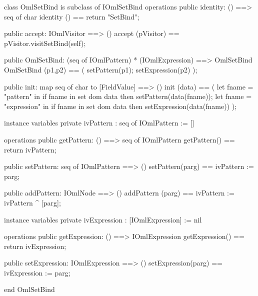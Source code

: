 \begin{vdm_al}
class OmlSetBind is subclass of IOmlSetBind
operations
  public identity: () ==> seq of char
  identity () == return "SetBind";

  public accept: IOmlVisitor ==> ()
  accept (pVisitor) == pVisitor.visitSetBind(self);

  public OmlSetBind:
      (seq of IOmlPattern) *
      (IOmlExpression) ==> OmlSetBind
  OmlSetBind (p1,p2) == 
   ( setPattern(p1);
     setExpression(p2) );

  public init: map seq of char to [FieldValue] ==> ()
  init (data) ==
    ( let fname = "pattern" in
        if fname in set dom data
        then setPattern(data(fname));
      let fname = "expression" in
        if fname in set dom data
        then setExpression(data(fname)) );

instance variables
  private ivPattern : seq of IOmlPattern := []

operations
  public getPattern: () ==> seq of IOmlPattern
  getPattern() == return ivPattern;

  public setPattern: seq of IOmlPattern ==> ()
  setPattern(parg) == ivPattern := parg;

  public addPattern: IOmlNode ==> ()
  addPattern (parg) == ivPattern := ivPattern ^ [parg];

instance variables
  private ivExpression : [IOmlExpression] := nil

operations
  public getExpression: () ==> IOmlExpression
  getExpression() == return ivExpression;

  public setExpression: IOmlExpression ==> ()
  setExpression(parg) == ivExpression := parg;

end OmlSetBind
\end{vdm_al}

